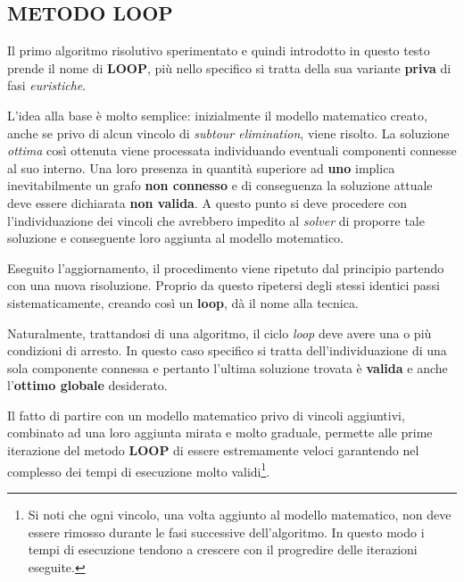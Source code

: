 \documentclass[11pt]{article}
\begin{document}
\subsection*{METODO LOOP}
\label{sec:MetodoLoopS}

Il primo algoritmo risolutivo sperimentato e quindi introdotto in questo testo prende il nome di \textbf{LOOP}, più nello specifico si tratta della sua variante \textbf{priva} di fasi \textit{euristiche}.

L'idea alla base è molto semplice: inizialmente il modello matematico creato, anche se privo di alcun vincolo di \textit{subtour elimination}, viene risolto. La soluzione \textit{ottima} così ottenuta viene processata individuando eventuali componenti connesse al suo interno. Una loro presenza in quantità superiore ad \textbf{uno} implica inevitabilmente un grafo \textbf{non connesso} e di conseguenza la soluzione attuale deve essere dichiarata \textbf{non valida}. A questo punto si deve procedere con l'individuazione dei vincoli che avrebbero impedito al \textit{solver} di proporre tale soluzione e conseguente loro aggiunta al modello motematico.

Eseguito l'aggiornamento, il procedimento viene ripetuto dal principio partendo con una nuova risoluzione. Proprio da questo ripetersi degli stessi identici passi sistematicamente, creando così un \textbf{loop}, dà il nome alla tecnica.

Naturalmente, trattandosi di una algoritmo, il ciclo \textit{loop} deve avere una o più condizioni di arresto. In questo caso specifico si tratta dell'individuazione di una sola componente connessa e pertanto l'ultima soluzione trovata è \textbf{valida} e anche l'\textbf{ottimo globale} desiderato.

Il fatto di partire con un modello matematico privo di vincoli aggiuntivi, combinato ad una loro aggiunta mirata e molto graduale, permette alle prime iterazione del metodo \textbf{LOOP} di essere estremamente veloci garantendo nel complesso dei tempi di esecuzione molto validi\footnote{Si noti che ogni vincolo, una volta aggiunto al modello matematico, non deve essere rimosso durante le fasi successive dell'algoritmo. In questo modo i tempi di esecuzione tendono a crescere con il progredire delle iterazioni eseguite.}.
\end{document}
